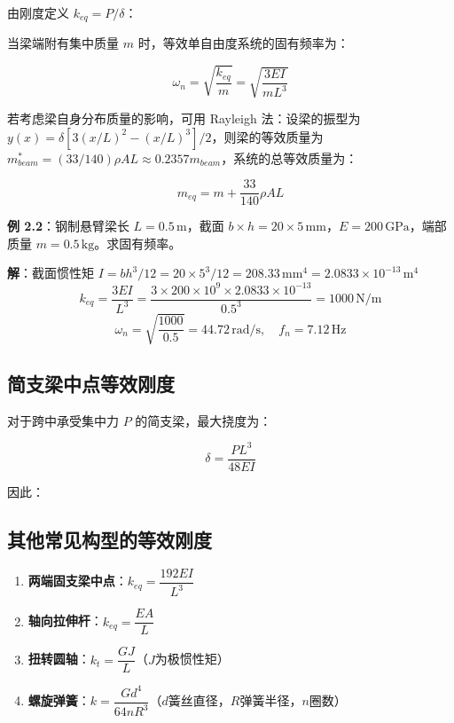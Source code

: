 由刚度定义 $k_{eq} = P/\delta$：
\begin{myformula}
    \end{myformula}

当梁端附有集中质量 $m$ 时，等效单自由度系统的固有频率为：
\begin{myformula}
    \[
    \omega_n = \sqrt{\frac{k_{eq}}{m}} = \sqrt{\frac{3EI}{mL^3}}
    \]
\end{myformula}

若考虑梁自身分布质量的影响，可用 Rayleigh 法：设梁的振型为 $y(x) = \delta[3(x/L)^2 - (x/L)^3]/2$，则梁的等效质量为 $m_{beam}^* = (33/140)\rho A L \approx 0.2357 m_{beam}$，系统的总等效质量为：
\begin{myformula}
    \[
    m_{eq} = m + \frac{33}{140}\rho A L
    \]
\end{myformula}

\textbf{例 2.2}：钢制悬臂梁长 $L = 0.5\,\text{m}$，截面 $b \times h = 20\times 5\,\text{mm}$，$E = 200\,\text{GPa}$，端部质量 $m = 0.5\,\text{kg}$。求固有频率。

\textbf{解}：截面惯性矩 $I = bh^3/12 = 20\times 5^3/12 = 208.33\,\text{mm}^4 = 2.0833\times 10^{-13}\,\text{m}^4$
\[
k_{eq} = \frac{3EI}{L^3} = \frac{3\times 200\times 10^9\times 2.0833\times 10^{-13}}{0.5^3} = 1000\,\text{N/m}
\]
\[
\omega_n = \sqrt{\frac{1000}{0.5}} = 44.72\,\text{rad/s},\quad f_n = 7.12\,\text{Hz}
\]

\subsection{简支梁中点等效刚度}

对于跨中承受集中力 $P$ 的简支梁，最大挠度为：
\begin{myformula}
    \[
    \delta = \frac{PL^3}{48EI}
    \]
\end{myformula}

因此：
\begin{myformula}
    \end{myformula}

\subsection{其他常见构型的等效刚度}

\begin{enumerate}
    \item \textbf{两端固支梁中点}：$k_{eq} = \dfrac{192EI}{L^3}$
    \item \textbf{轴向拉伸杆}：$k_{eq} = \dfrac{EA}{L}$
    \item \textbf{扭转圆轴}：$k_t = \dfrac{GJ}{L}$（$J$为极惯性矩）
    \item \textbf{螺旋弹簧}：$k = \dfrac{Gd^4}{64nR^3}$（$d$簧丝直径，$R$弹簧半径，$n$圈数）
\end{enumerate}

